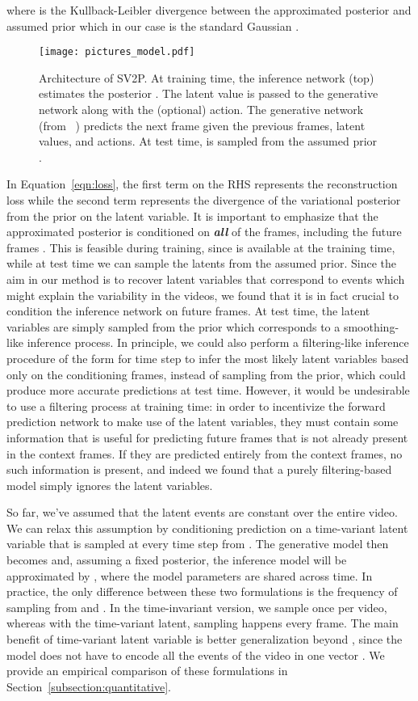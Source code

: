 \documentclass{article} \usepackage{iclr2018_conference,times}
\begin{document}
where  is the Kullback-Leibler divergence between the approximated posterior and assumed prior  which in our case is the standard Gaussian . 

\begin{figure}[t]
  \centering
\texttt{[image: pictures\_model.pdf]}
\caption{Architecture of SV2P. At training time, the inference network (top) estimates the posterior . The latent value  is passed to the generative network along with the (optional) action. The generative network (from ~\cite{finn2016unsupervised}) predicts the next frame given the previous frames, latent values, and actions. At test time,  is sampled from the assumed prior .}
  \label{fig:model}
\end{figure} 
In Equation~\ref{eqn:loss}, the first term on the RHS represents the reconstruction loss while the second term represents the divergence of the variational posterior from the prior on the latent variable. It is important to emphasize that the approximated posterior is conditioned on \textit{\textbf{all}} of the frames, including the future frames . This is feasible during training, since  is available at the training time, while at test time we can sample the latents from the assumed prior.
Since the aim in our method is to recover latent variables that correspond to events which might explain the variability in the videos, we found that it is in fact crucial to condition the inference network on future frames. At test time, the latent variables are simply sampled from the prior which corresponds to a smoothing-like inference process. In principle, we could also perform a filtering-like inference procedure of the form  for time step  to infer the most likely latent variables based only on the conditioning frames, instead of sampling from the prior, which could produce more accurate predictions at test time. However, it would be undesirable to use a filtering process at training time: in order to incentivize the forward prediction network to make use of the latent variables, they must contain some information that is useful for predicting future frames that is not already present in the context frames. If they are predicted entirely from the context frames, no such information is present, and indeed we found that a purely filtering-based model simply ignores the latent variables.


So far, we've assumed that the latent events are constant over the entire video. We can relax this assumption by conditioning prediction on a time-variant latent variable  that is sampled at every time step from . The generative model then becomes  and, assuming a fixed posterior, the inference model will be approximated by , where the model parameters  are shared across time.
In practice, the only difference between these two formulations is the frequency of sampling  from  and . In the time-invariant version, we sample  once per video, whereas with the time-variant latent, sampling happens every frame. The main benefit of time-variant latent variable is better generalization beyond , since the model does not have to encode all the events of the video in one vector . We provide an empirical comparison of these formulations in Section~\ref{subsection:quantitative}.
\end{document}
